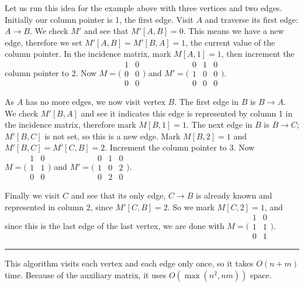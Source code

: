 \documentclass{report}
\newcommand{\okthen}{\rule[-1.4pt]{0.3em}{0.77em}}
\begin{document}
\smallskip

Let us run this idea for the example above with three vertices and two edges. Initially our column pointer is 1, the first edge. Visit $A$ and traverse its first edge: $A\to B$. We check $M'$ and see that $M'[A,B] = 0$. This means we have a new edge, therefore we set $M'[A,B] = M'[B,A] = 1$, the current value of the column pointer. In the incidence matrix, mark $M[A,1] = 1$, then increment the column pointer to 2. Now $M = \big(\begin{smallmatrix}1&0\\0&0\\0&0\end{smallmatrix}\big)$ and $M' = \big(\begin{smallmatrix}0&1&0\\1&0&0\\0&0&0\end{smallmatrix}\big)$.

As $A$ has no more edges, we now visit vertex $B$. The first edge in $B$ is $B\to A$. We check $M'[B,A]$ and see it indicates this edge is represented by column 1 in the incidence matrix, therefore mark $M[B,1] = 1$. The next edge in $B$ is $B\to C$; $M'[B,C]$ is not set, so this is a new edge. Mark $M[B,2] = 1$ and $M'[B,C] = M'[C,B] = 2$. Increment the column pointer to 3. Now $M = \big(\begin{smallmatrix}1&0\\1&1\\0&0\end{smallmatrix}\big)$ and $M' = \big(\begin{smallmatrix}0&1&0\\1&0&2\\0&2&0\end{smallmatrix}\big)$.

Finally we visit $C$ and see that its only edge, $C\to B$ is already known and represented in column 2, since $M'[C,B] = 2$. So we mark $M[C,2] = 1$, and since this is the last edge of the last vertex, we are done with $M = \big(\begin{smallmatrix}1&0\\1&1\\0&1\end{smallmatrix}\big)$.\ \okthen

\smallskip

This algorithm visits each vertex and each edge only once, so it takes $O(n+m)$ time. Because of the auxiliary matrix, it uses $O(\max(n^2, nm))$ space.
\end{document}
